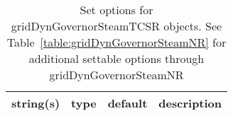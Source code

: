 \begin{table}[ht]
\centering
\begin{tabular}{p{5cm} c c p{7cm}}
\hline
string(s) & type & default & description \\
\hline
\hline
\end{tabular}
\caption{Set options for gridDynGovernorSteamTCSR objects. See Table~\ref{table:gridDynGovernorSteamNR} for additional settable options through gridDynGovernorSteamNR}
\label{table:gridDynGovernorSteamTCSR}
\end{table}

